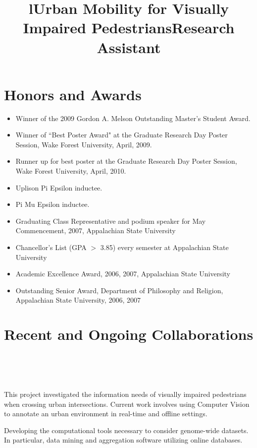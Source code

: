 \documentclass[overlapped,line,letterpaper]{res}
\begin{document}
\begin{resume}
\section{\bf Honors and Awards}
\begin{itemize}
\item Winner of the 2009 Gordon A. Melson Outstanding Master's Student Award.
\item Winner of ``Best Poster Award" at the Graduate Research Day Poster Session, Wake Forest University, April, 2009.
\item Runner up for best poster at the Graduate Research Day Poster Session, Wake Forest University, April, 2010.
\item Uplison Pi Epsilon inductee.
\item Pi Mu Epsilon inductee.
\item Graduating Class Representative and podium speaker for May Commencement, 2007, Appalachian State University
\item Chancellor's List (GPA $>$ 3.85) every semester at Appalachian State University
\item Academic Excellence Award, 2006, 2007, Appalachian State University
\item Outstanding Senior Award, Department of Philosophy and Religion, Appalachian State University, 2006, 2007
\end{itemize}

\section{\bf Recent and Ongoing Collaborations}
\begin{format}
\title{l}\\
\\
\body\\
\end{format}


\title{Urban Mobility for Visually Impaired Pedestrians}
\begin{position}
This project investigated the information needs of visually impaired pedestrians when crossing urban intersections. Current work involves using Computer Vision to annotate an urban environment in real-time and offline settings.
\end{position}

\title{Research Assistant}
\begin{position}
Developing the computational tools necessary to consider genome-wide datasets.  In particular, data mining and aggregation software utilizing online databases.
\end{position}


\end{resume}
\end{document}
